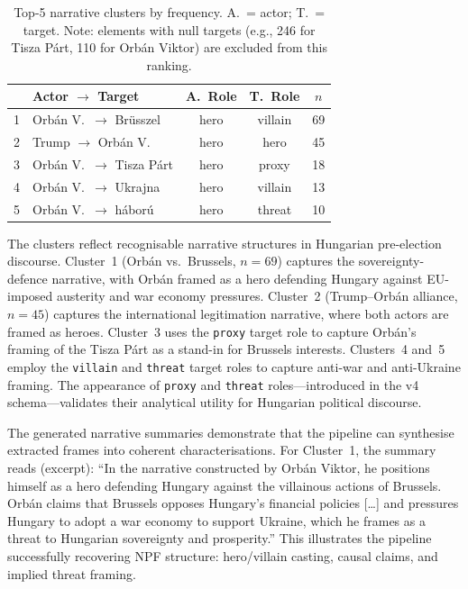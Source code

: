 \documentclass[10pt, a4paper]{article}
\begin{document}
\begin{table}[!ht]
\begin{center}
\begin{tabular}{clccc}
  \hline
  & \textbf{Actor $\rightarrow$ Target} & \textbf{A.\ Role} & \textbf{T.\ Role} & \textbf{$n$} \\
  \hline
  1 & Orb\'an V.\ $\rightarrow$ Br\"usszel & hero & villain & 69 \\
  2 & Trump $\rightarrow$ Orb\'an V. & hero & hero & 45 \\
  3 & Orb\'an V.\ $\rightarrow$ Tisza P\'art & hero & proxy & 18 \\
  4 & Orb\'an V.\ $\rightarrow$ Ukrajna & hero & villain & 13 \\
  5 & Orb\'an V.\ $\rightarrow$ h\'abor\'u & hero & threat & 10 \\
  \hline
\end{tabular}
\caption{Top-5 narrative clusters by frequency. A.\ = actor; T.\ = target. Note: elements with null targets (e.g., 246 for Tisza P\'art, 110 for Orb\'an Viktor) are excluded from this ranking.}
\label{tab:clusters}
\end{center}
\end{table}

The clusters reflect recognisable narrative structures in Hungarian pre-election discourse. Cluster~1 (Orb\'an vs.\ Brussels, $n=69$) captures the sovereignty-defence narrative, with Orb\'an framed as a hero defending Hungary against EU-imposed austerity and war economy pressures. Cluster~2 (Trump--Orb\'an alliance, $n=45$) captures the international legitimation narrative, where both actors are framed as heroes. Cluster~3 uses the \texttt{proxy} target role to capture Orb\'an's framing of the Tisza P\'art as a stand-in for Brussels interests. Clusters~4 and~5 employ the \texttt{villain} and \texttt{threat} target roles to capture anti-war and anti-Ukraine framing. The appearance of \texttt{proxy} and \texttt{threat} roles---introduced in the v4 schema---validates their analytical utility for Hungarian political discourse.

The generated narrative summaries demonstrate that the pipeline can synthesise extracted frames into coherent characterisations. For Cluster~1, the summary reads (excerpt): ``In the narrative constructed by Orb\'an Viktor, he positions himself as a hero defending Hungary against the villainous actions of Brussels. Orb\'an claims that Brussels opposes Hungary's financial policies [\ldots] and pressures Hungary to adopt a war economy to support Ukraine, which he frames as a threat to Hungarian sovereignty and prosperity.'' This illustrates the pipeline successfully recovering NPF structure: hero/villain casting, causal claims, and implied threat framing.
\end{document}
